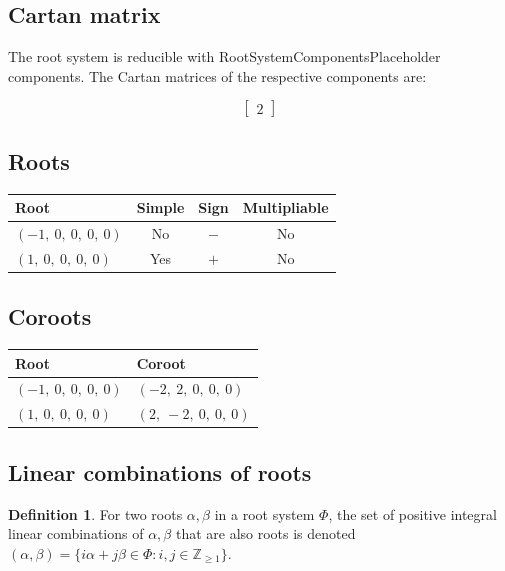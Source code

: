 \documentclass[11pt]{article}
\theoremstyle{definition}
\newtheorem{definition}{Definition}[section]
\newif\ifrootsystemirreducible
\begin{document}
\subsection{Cartan matrix}

\ifrootsystemirreducible
The root system is irreducible and has Cartan matrix:
\else
The root system is reducible with RootSystemComponentsPlaceholder components. The Cartan matrices of the respective components are:
\fi

\[
\left[\begin{matrix}2\end{matrix}\right]
\]

\subsection{Roots}

\begin{tabular}{|l|c|c|c|}
    \hline
    \textbf{Root} & \textbf{Simple} & \textbf{Sign} & \textbf{Multipliable} \\
    \hline
    $\left( -1, \  0, \  0, \  0, \  0\right)$ & No & $-$ & No \\
    \hline
    $\left( 1, \  0, \  0, \  0, \  0\right)$ & Yes & $+$ & No \\
    \hline
\end{tabular}


\subsection{Coroots}

\begin{tabular}{|l|l|}
    \hline
    \textbf{Root} & \textbf{Coroot} \\
    \hline
    $\left( -1, \  0, \  0, \  0, \  0\right)$ & $\left( -2, \  2, \  0, \  0, \  0\right)$ \\
    \hline
    $\left( 1, \  0, \  0, \  0, \  0\right)$ & $\left( 2, \  -2, \  0, \  0, \  0\right)$ \\
    \hline
\end{tabular}


\subsection{Linear combinations of roots}

\begin{definition}
For two roots $\alpha, \beta$ in a root system $\Phi$, the set of positive integral linear combinations of $\alpha, \beta$ that are also roots is denoted
\(
	(\alpha, \beta) = \{ i \alpha + j \beta \in \Phi : i, j \in \mathbb{Z}_{\ge 1} \}
\).
\end{definition}
\end{document}
